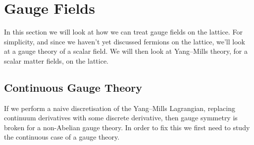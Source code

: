 \documentclass[fleqn]{NotesClass}
\begin{document}
    \chapter{Gauge Fields}
    In this section we will look at how we can treat gauge fields on the lattice.
    For simplicity, and since we haven't yet discussed fermions on the lattice, we'll look at a gauge theory of a scalar field.
    We will then look at Yang--Mills theory, for a scalar matter fields, on the lattice.
    
    \section{Continuous Gauge Theory}
    If we perform a naive discretisation of the Yang--Mills Lagrangian, replacing continuum derivatives with some discrete derivative, then gauge symmetry is broken for a non-Abelian gauge theory.
    In order to fix this we first need to study the continuous case of a gauge theory.
    
\end{document}
